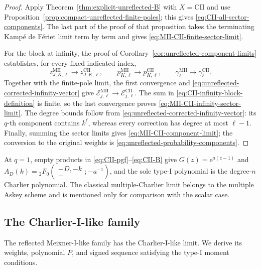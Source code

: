 \documentclass[10pt]{amsart}
\newcommand{\e}{\mathrm e}
\newcommand{\fall}[2]{#1^{\underline{#2}}}
\newcommand{\pFq}[5]{{}_{#1}F_{#2}\!\left(\begin{matrix}#3\\#4\end{matrix};#5\right)}
\theoremstyle{plain}
\theoremstyle{definition}
\theoremstyle{remark}
\begin{document}
\begin{proof}
Apply Theorem~\ref{thm:explicit-unreflected-B} with
$X=\mathrm{CII}$ and use
Proposition~\ref{prop:compact-unreflected-finite-poles}; this gives
\eqref{eq:CII-all-sector-components}. The last part of the proof of that
proposition takes the terminating Kamp\'e de F\'eriet limit term by term and
gives \eqref{eq:MII-CII-finite-sector-limit}.

For the block at infinity, the proof of
Corollary~\ref{cor:unreflected-component-limits} establishes, for every
fixed indicated index,
\[
 z_{J,K,\ell}^{\mathrm{MII}}\longrightarrow
 z_{J,K,\ell}^{\mathrm{CII}},\qquad
 p_{K,\ell}^{\mathrm{MII}}\longrightarrow
 p_{K,\ell}^{\mathrm{CII}},\qquad
 \gamma_\ell^{\mathrm{MII}}\longrightarrow
 \gamma_\ell^{\mathrm{CII}}.
\]
Together with the finite-pole limit, the first convergence and
\eqref{eq:unreflected-corrected-infinity-vector} give
\(\mathcal E_{j,\ell}^{\mathrm{MII}}\to
\mathcal E_{j,\ell}^{\mathrm{CII}}\). The sum in
\eqref{eq:CII-infinity-block-definition} is finite, so the last convergence
proves \eqref{eq:MII-CII-infinity-sector-limit}. The degree bounds follow
from \eqref{eq:unreflected-corrected-infinity-vector}: its \(q\)-th
component contains \(\fall{k}{\ell}\), whereas every correction has
degree at most \(\ell-1\). Finally, summing the sector limits gives
\eqref{eq:MII-CII-component-limit}; the conversion to the original weights
is \eqref{eq:unreflected-probability-components}.
\end{proof}

At \(q=1\), empty products in
\eqref{eq:CII-pgf}--\eqref{eq:CII-B}
give \(G(z)=\e^{a(z-1)}\) and
\(A_D(k)=\pFq{2}{0}{-D,-k}{-}{-a^{-1}}\), and the sole type-I
polynomial is the degree-\(n\) Charlier polynomial.
The classical multiple-Charlier limit belongs to the multiple Askey scheme
\cite{BranquinhoDiazFoulquieManasWolfs2024Discrete} and is
mentioned only for comparison with the scalar case.


\subsection{The Charlier-I-like family}

The reflected Meixner-I-like family has the Charlier-I-like limit. We derive
its weights, polynomial \(P\), and signed sequence satisfying the type-I
moment conditions.
\end{document}
